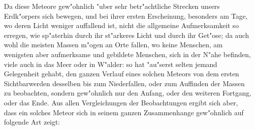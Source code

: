 \documentclass[a4paper, 11pt, oneside, polutonikogreek, german]{article}
\begin{document}
Da diese Meteore gew"ohnlich "uber sehr betr"achtliche Strecken unsers Erdk"orpers sich bewegen, und bei ihrer ersten Erscheinung, besonders am Tage, wo deren Licht weniger auffallend ist, nicht die allgemeine Aufmerksamkeit so erregen, wie sp"aterhin durch ihr st"arkeres Licht und durch ihr Get"ose; da auch wohl die meisten Massen m"ogen an Orte fallen, wo keine Menschen, am wenigsten aber aufmerksame und gebildete Menschen, sich in der N"ahe befinden, viele auch in das Meer oder in W"alder: so hat "au"serst selten jemand Gelegenheit gehabt, den ganzen Verlauf eines solchen Meteors von dem ersten Sichtbarwerden desselben bis zum Niederfallen, oder zum Auffinden der Massen zu beobachten, sondern gew"ohnlich nur den Anfang, oder den weiteren Fortgang, oder das Ende. Aus allen Vergleichungen der Beobachtungen ergibt sich aber, dass ein solches Meteor sich in seinem ganzen Zusammenhange gew"ohnlich auf folgende Art zeigt:
\end{document}
